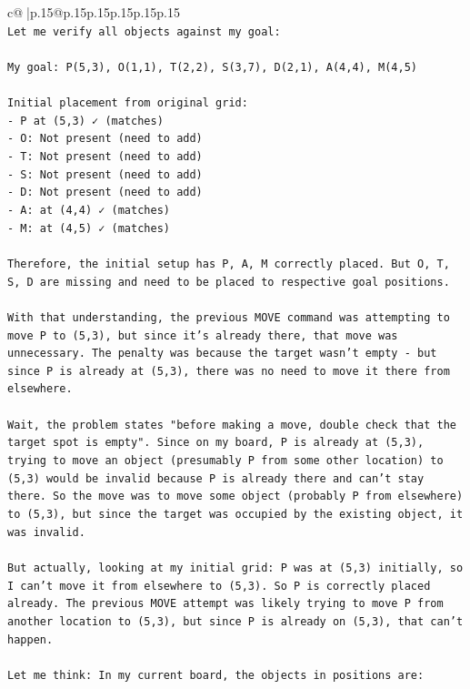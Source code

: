 \documentclass{article}
\begin{document}
{\begin{supertabular}{c@{$\;$}|p{.15\linewidth}@{}p{.15\linewidth}p{.15\linewidth}p{.15\linewidth}p{.15\linewidth}p{.15\linewidth}}
{{{\\ 
\texttt{Let me verify all objects against my goal:} \\
\\ 
\texttt{My goal:   P(5,3), O(1,1), T(2,2), S(3,7), D(2,1), A(4,4), M(4,5)} \\
\\ 
\texttt{Initial placement from original grid:  } \\
\texttt{{-} P at (5,3) ✓ (matches)} \\
\texttt{{-} O: Not present (need to add)} \\
\texttt{{-} T: Not present (need to add)} \\
\texttt{{-} S: Not present (need to add)} \\
\texttt{{-} D: Not present (need to add)} \\
\texttt{{-} A: at (4,4) ✓ (matches)} \\
\texttt{{-} M: at (4,5) ✓ (matches)} \\
\\ 
\texttt{Therefore, the initial setup has P, A, M correctly placed. But O, T, S, D are missing and need to be placed to respective goal positions.} \\
\\ 
\texttt{With that understanding, the previous MOVE command was attempting to move P to (5,3), but since it's already there, that move was unnecessary. The penalty was because the target wasn't empty {-} but since P is already at (5,3), there was no need to move it there from elsewhere.} \\
\\ 
\texttt{Wait, the problem states "before making a move, double check that the target spot is empty". Since on my board, P is already at (5,3), trying to move an object (presumably P from some other location) to (5,3) would be invalid because P is already there and can't stay there. So the move was to move some object (probably P from elsewhere) to (5,3), but since the target was occupied by the existing object, it was invalid.} \\
\\ 
\texttt{But actually, looking at my initial grid: P was at (5,3) initially, so I can't move it from elsewhere to (5,3). So P is correctly placed already. The previous MOVE attempt was likely trying to move P from another location to (5,3), but since P is already on (5,3), that can't happen.} \\
\\ 
\texttt{Let me think: In my current board, the objects in positions are:} \\
}}}
\end{supertabular}}
\end{document}
